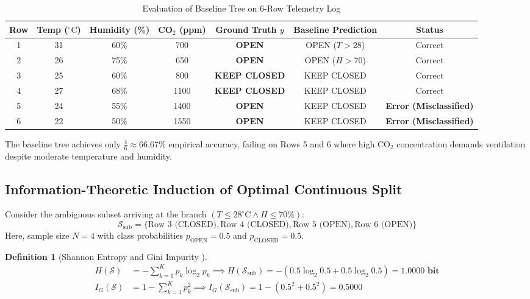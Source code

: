 \documentclass[11pt,a4paper]{article}
\theoremstyle{definition}
\newtheorem{definition}{Definition}[section]
\theoremstyle{plain}
\theoremstyle{remark}
\begin{document}
\begin{table}[htbp]
\centering
\small
\caption{Evaluation of Baseline Tree on 6-Row Telemetry Log}
\label{tab:greenhouse_log}
\begin{tabular}{c c c c c c c}
\toprule
\textbf{Row} & \textbf{Temp ($^\circ\text{C}$)} & \textbf{Humidity (\%)} & \textbf{CO$_2$ (ppm)} & \textbf{Ground Truth $y$} & \textbf{Baseline Prediction} & \textbf{Status} \\
\midrule
1 & 31 & 60\% & 700 & \textbf{OPEN} & OPEN ($T > 28$) & Correct \\
2 & 26 & 75\% & 650 & \textbf{OPEN} & OPEN ($H > 70$) & Correct \\
3 & 25 & 60\% & 800 & \textbf{KEEP CLOSED} & KEEP CLOSED & Correct \\
4 & 27 & 68\% & 1100 & \textbf{KEEP CLOSED} & KEEP CLOSED & Correct \\
5 & 24 & 55\% & 1400 & \textbf{OPEN} & KEEP CLOSED & \textbf{Error (Misclassified)} \\
6 & 22 & 50\% & 1550 & \textbf{OPEN} & KEEP CLOSED & \textbf{Error (Misclassified)} \\
\bottomrule
\end{tabular}
\end{table}

The baseline tree achieves only $\frac{4}{6} \approx 66.67\%$ empirical accuracy, failing on Rows 5 and 6 where high $\text{CO}_2$ concentration demands ventilation despite moderate temperature and humidity.

\subsection{Information-Theoretic Induction of Optimal Continuous Split}
Consider the ambiguous subset arriving at the branch $(T \le 28^\circ\text{C} \land H \le 70\%)$:
\begin{equation}
\mathcal{S}_{\text{sub}} = \{\text{Row 3 (CLOSED)}, \text{Row 4 (CLOSED)}, \text{Row 5 (OPEN)}, \text{Row 6 (OPEN)}\}
\end{equation}
Here, sample size $N = 4$ with class probabilities $p_{\text{OPEN}} = 0.5$ and $p_{\text{CLOSED}} = 0.5$.

\begin{definition}[Shannon Entropy and Gini Impurity \cite{quinlan1986induction,breiman1984classification}]
\begin{align}
H(\mathcal{S}) &= -\sum_{k=1}^K p_k \log_2 p_k \implies H(\mathcal{S}_{\text{sub}}) = -(0.5 \log_2 0.5 + 0.5 \log_2 0.5) = \mathbf{1.0000 \text{ bit}} \\
I_G(\mathcal{S}) &= 1 - \sum_{k=1}^K p_k^2 \implies I_G(\mathcal{S}_{\text{sub}}) = 1 - (0.5^2 + 0.5^2) = \mathbf{0.5000}
\end{align}
\end{definition}
\end{document}
